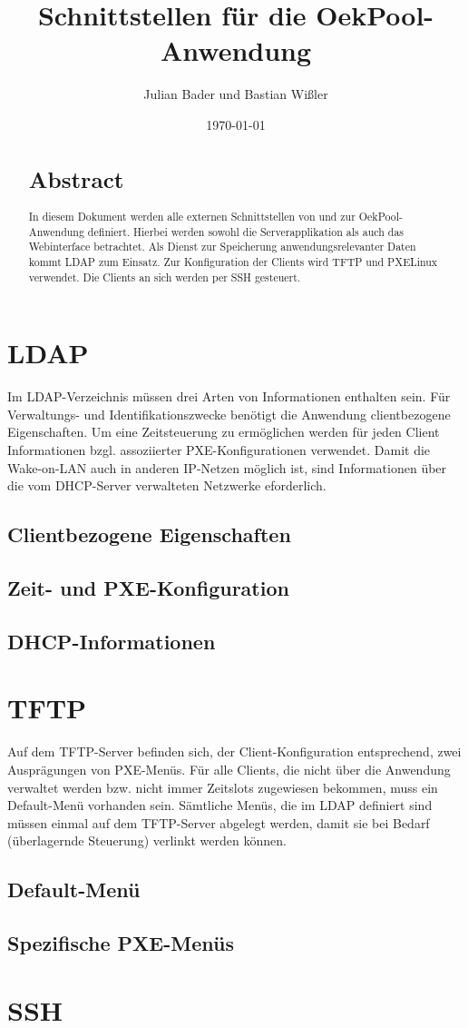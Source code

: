 \documentclass[	
				a4paper, 
				twoside,
				11pt,
				DIV11,
				BCOR12mm,
				bibtotoc, 
				halfparskip, 
				headsepline, 
				pointlessnumbers]{scrartcl}
\title{Schnittstellen für die OekPool-Anwendung}
\author{Julian Bader und Bastian Wißler}
\date{\today}
\begin{document}
\maketitle
\indent
\begin{abstract}
\section*{Abstract}
In diesem Dokument werden alle externen Schnittstellen von und zur OekPool-Anwendung definiert.
Hierbei werden sowohl die Serverapplikation als auch das Webinterface betrachtet.
Als Dienst zur Speicherung anwendungsrelevanter Daten kommt LDAP zum Einsatz.
Zur Konfiguration der Clients wird TFTP und PXELinux verwendet.
Die Clients an sich werden per SSH gesteuert.
\end{abstract}
\newpage

\section{LDAP}
Im LDAP-Verzeichnis müssen drei Arten von Informationen enthalten sein.
Für Verwaltungs- und Identifikationszwecke benötigt die Anwendung clientbezogene Eigenschaften.
Um eine Zeitsteuerung zu ermöglichen werden für jeden Client Informationen bzgl. assoziierter PXE-Konfigurationen verwendet.
Damit die Wake-on-LAN auch in anderen IP-Netzen möglich ist, sind Informationen über die vom DHCP-Server verwalteten Netzwerke eforderlich.

\subsection{Clientbezogene Eigenschaften}
\subsection{Zeit- und PXE-Konfiguration}
\subsection{DHCP-Informationen}

\section{TFTP}
Auf dem TFTP-Server befinden sich, der Client-Konfiguration entsprechend, zwei Ausprägungen von PXE-Menüs.
Für alle Clients, die nicht über die Anwendung verwaltet werden bzw. nicht immer Zeitslots zugewiesen bekommen, muss ein Default-Menü vorhanden sein.
Sämtliche Menüs, die im LDAP definiert sind müssen einmal auf dem TFTP-Server abgelegt werden, damit sie bei Bedarf (überlagernde Steuerung) verlinkt werden können.

\subsection{Default-Menü}

\subsection{Spezifische PXE-Menüs}

\section{SSH}
\end{document}
